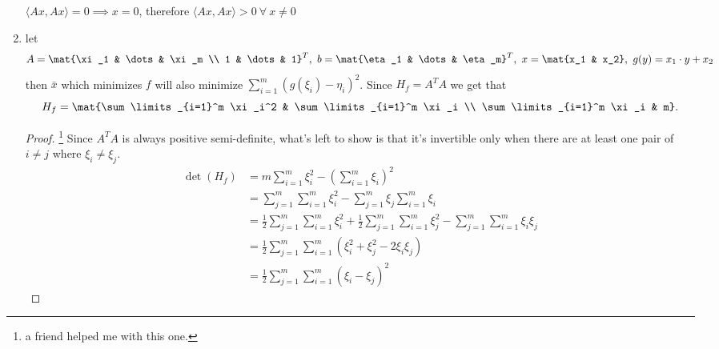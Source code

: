 \documentclass{article}
\begin{document}
\begin{tasks}
\begin{enumerate}
                  \(\langle Ax, Ax\rangle = 0 \implies x = 0\), therefore 
                  \(\langle Ax, Ax\rangle > 0 \ \forall \ x \ne 0 \)
            \item let
                  \begin{displaymath}
                    A = \mat{\xi_1 & \dots & \xi_m \\ 1 & \dots & 1}^T,\
                    b = \mat{\eta_1 & \dots & \eta_m}^T,\
                    x = \mat{x_1 & x_2},\
                    g(y) = x_1\cdot y + x_2
                  \end{displaymath}
                  then \(\bar{x}\) which minimizes \(f\) will also minimize \(\sum_{i=1}^m (g(\xi_i) - \eta_i)^2\).
                  Since \(H_f = A^TA\) we get that 
                  \begin{displaymath}
                    H_f = \mat{\sum\limits_{i=1}^m \xi_i^2 & \sum\limits_{i=1}^m \xi_i \\ \sum\limits_{i=1}^m \xi_i & m}.
                  \end{displaymath}
                  \begin{proof}\footnote{a friend helped me with this one.}
                    Since \(A^TA\) is always positive semi-definite, what's left to show is 
                    that it's invertible only when there are at least one pair of \(i \ne j\) 
                    where \(\xi_i \ne \xi_j\).
                    \footnotesize
                    \begin{displaymath}
                        \begin{aligned}
                            \det(H_f) 
                            &= m\sum\limits_{i=1}^m \xi_i^2 - \left(\sum\limits_{i=1}^m \xi_i\right)^2 \\
                            &= \sum\limits_{j=1}^m\sum\limits_{i=1}^m \xi_i^2 - \sum\limits_{j=1}^m\xi_j\sum\limits_{i=1}^m \xi_i \\
                            &= \frac{1}{2}\sum\limits_{j=1}^m\sum\limits_{i=1}^m \xi_i^2 + \frac{1}{2}\sum\limits_{j=1}^m\sum\limits_{i=1}^m \xi_j^2 - \sum\limits_{j=1}^m\sum\limits_{i=1}^m \xi_i\xi_j \\
                            &= \frac{1}{2}\sum\limits_{j=1}^m\sum\limits_{i=1}^m \left(\xi_i^2 + \xi_j^2 - 2\xi_i\xi_j\right) \\
                            &= \frac{1}{2}\sum\limits_{j=1}^m\sum\limits_{i=1}^m (\xi_i - \xi_j)^2
                        \end{aligned}
                    \end{displaymath}

\end{proof}
\end{enumerate}
\end{tasks}
\end{document}
